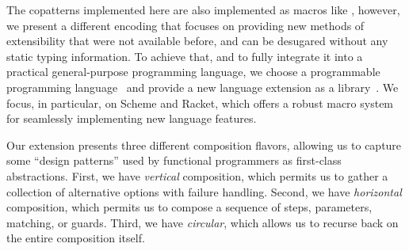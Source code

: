 The copatterns implemented here are also implemented as macros like \cite{LaforgueR17}, however, we present a different encoding that focuses on providing new methods of extensibility that were not available before, and can be desugared without any static typing information.
To achieve that, and to fully integrate it into a practical general-purpose programming language, we choose a programmable programming language~\cite{ProgrammablePL} and provide a new language extension as a library~\cite{LanguageLibrary}.
We focus, in particular, on Scheme and Racket, which offers a robust macro system for seamlessly implementing new language features.

Our extension presents three different composition flavors, allowing us to capture some ``design patterns'' used by functional programmers as first-class abstractions.
First, we have \emph{vertical} composition, which permits us to gather a collection of alternative options with failure handling.
Second, we have \emph{horizontal} composition, which permits us to compose a sequence of steps, parameters, matching, or guards.
Third, we have \emph{circular}, which allows us to recurse back on the entire composition itself.

